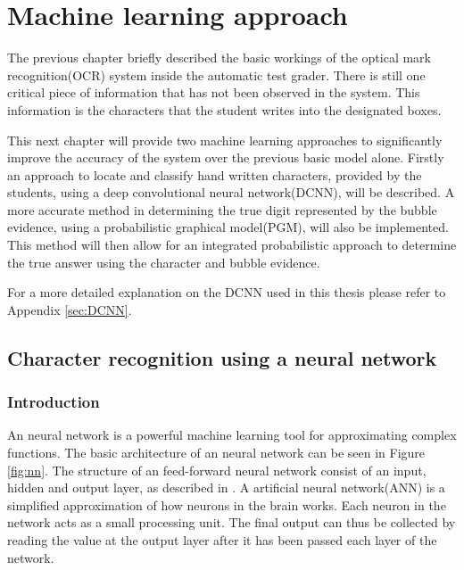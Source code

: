 \chapter{Machine learning approach}
\label{ch:MachineLearning}
\graphicspath{{Chapter4/Chapter4Figures/}}
The previous chapter briefly described the basic workings of the optical mark recognition(OCR) system inside the automatic test grader. There is still one critical piece of information that has not been observed in the system. This information is the characters that the student writes into the designated boxes.

This next chapter will provide two machine learning approaches to significantly improve the accuracy of the system over the previous basic model alone. Firstly an approach to locate and classify hand written characters, provided by the students, using a deep convolutional neural network(DCNN), will be described. A more accurate method in determining the true digit represented by the bubble evidence, using a probabilistic  graphical model(PGM), will also be implemented. This method will then allow for an integrated probabilistic approach to determine the true answer using the character and bubble evidence.

For a more detailed explanation on the DCNN used in this thesis please refer to Appendix \ref{sec:DCNN}.

\section{Character recognition using a neural network}

\subsection{Introduction}

An neural network is a powerful machine learning tool for approximating complex functions. The basic architecture of an neural network can be seen in Figure \ref{fig:nn}. The structure of an feed-forward neural network consist of an input, hidden and output layer, as described in \citet{MichealN2015}. A artificial neural network(ANN) is a simplified approximation of how neurons in the brain works. Each neuron in the network acts as a small processing unit. The final output can thus be collected by reading the value at the output layer after it has been passed each layer of the network.

